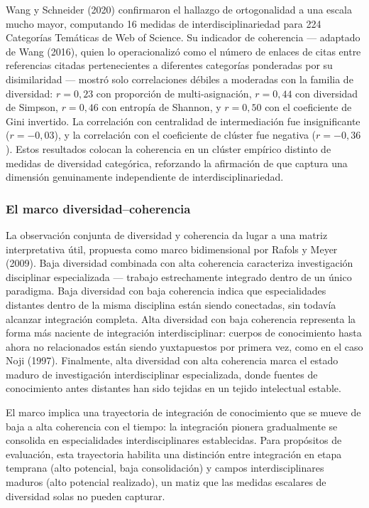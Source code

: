 \documentclass[
]{article}
\begin{document}
Wang y Schneider (2020) confirmaron el hallazgo de ortogonalidad a una
escala mucho mayor, computando 16 medidas de interdisciplinariedad para
224 Categorías Temáticas de Web of Science. Su indicador de coherencia
--- adaptado de Wang (2016), quien lo operacionalizó como el número de
enlaces de citas entre referencias citadas pertenecientes a diferentes
categorías ponderadas por su disimilaridad --- mostró solo correlaciones
débiles a moderadas con la familia de diversidad: \(r = 0,23\) con
proporción de multi-asignación, \(r = 0,44\) con diversidad de Simpson,
\(r = 0,46\) con entropía de Shannon, y \(r = 0,50\) con el coeficiente
de Gini invertido. La correlación con centralidad de intermediación fue
insignificante (\(r = -0,03\)), y la correlación con el coeficiente de
clúster fue negativa (\(r = -0,36\)). Estos resultados colocan la
coherencia en un clúster empírico distinto de medidas de diversidad
categórica, reforzando la afirmación de que captura una dimensión
genuinamente independiente de interdisciplinariedad.

\hypertarget{el-marco-diversidadcoherencia}{%
\subsubsection{El marco
diversidad--coherencia}\label{el-marco-diversidadcoherencia}}

La observación conjunta de diversidad y coherencia da lugar a una matriz
interpretativa útil, propuesta como marco bidimensional por Rafols y
Meyer (2009). Baja diversidad combinada con alta coherencia caracteriza
investigación disciplinar especializada --- trabajo estrechamente
integrado dentro de un único paradigma. Baja diversidad con baja
coherencia indica que especialidades distantes dentro de la misma
disciplina están siendo conectadas, sin todavía alcanzar integración
completa. Alta diversidad con baja coherencia representa la forma más
naciente de integración interdisciplinar: cuerpos de conocimiento hasta
ahora no relacionados están siendo yuxtapuestos por primera vez, como en
el caso Noji (1997). Finalmente, alta diversidad con alta coherencia
marca el estado maduro de investigación interdisciplinar especializada,
donde fuentes de conocimiento antes distantes han sido tejidas en un
tejido intelectual estable.

El marco implica una trayectoria de integración de conocimiento que se
mueve de baja a alta coherencia con el tiempo: la integración pionera
gradualmente se consolida en especialidades interdisciplinares
establecidas. Para propósitos de evaluación, esta trayectoria habilita
una distinción entre integración en etapa temprana (alto potencial, baja
consolidación) y campos interdisciplinares maduros (alto potencial
realizado), un matiz que las medidas escalares de diversidad solas no
pueden capturar.
\end{document}
